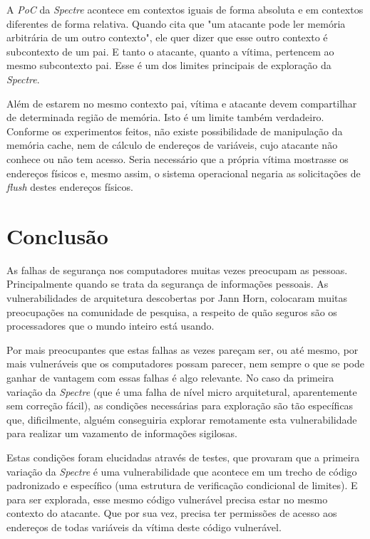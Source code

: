 \documentclass[
	article,			    %
	12pt,				    %
	oneside,			    %
	a4paper,			    %
	chapter=TITLE,		    %
	section=TITLE,		    %
	subsection=TITLE,	    %
	english,			    %
	brazil,				    %
	sumario=tradicional
]{abntex2}
\begin{document}
A \emph{PoC} da \emph{Spectre} acontece em contextos iguais de forma absoluta e em contextos diferentes de forma relativa. Quando  cita que "um atacante pode ler memória arbitrária de um outro contexto", ele quer dizer que esse outro contexto é subcontexto de um pai. E tanto o atacante, quanto a vítima, pertencem ao mesmo subcontexto pai. Esse é um dos limites principais de exploração da \emph{Spectre}.

Além de estarem no mesmo contexto pai, vítima e atacante devem compartilhar de determinada região de memória. Isto é um limite também verdadeiro. Conforme os experimentos feitos, não existe possibilidade de manipulação da memória cache, nem de cálculo de endereços de variáveis, cujo atacante não conhece ou não tem acesso. Seria necessário que a própria vítima mostrasse os endereços físicos e, mesmo assim, o sistema operacional negaria as solicitações de \emph{flush} destes endereços físicos.

\section{Conclusão}
As falhas de segurança nos computadores muitas vezes preocupam as pessoas. Principalmente quando se trata da segurança de informações pessoais. As vulnerabilidades de arquitetura descobertas por Jann Horn, colocaram muitas preocupações na comunidade de pesquisa, a respeito de quão seguros são os processadores que o mundo inteiro está usando.

Por mais preocupantes que estas falhas as vezes pareçam ser, ou até mesmo, por mais vulneráveis que os computadores possam parecer, nem sempre o que se pode ganhar de vantagem com essas falhas é algo relevante. No caso da primeira variação da \emph{Spectre} (que é uma falha de nível micro arquitetural, aparentemente sem correção fácil), as condições necessárias para exploração são tão específicas que, dificilmente, alguém conseguiria explorar remotamente esta vulnerabilidade para realizar um vazamento de informações sigilosas.

Estas condições foram elucidadas através de testes, que provaram que a primeira variação da \emph{Spectre} é uma vulnerabilidade que acontece em um trecho de código padronizado e específico (uma estrutura de verificação condicional de limites). E para ser explorada, esse mesmo código vulnerável precisa estar no mesmo contexto do atacante. Que por sua vez, precisa ter permissões de acesso aos endereços de todas variáveis da vítima deste código vulnerável.
\end{document}
